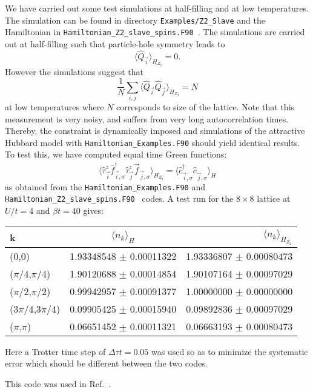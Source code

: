  We have carried out some test simulations at half-filling and at low temperatures.  The simulation can be found in directory \texttt{Examples/Z2\_Slave} and the  Hamiltonian in \texttt{Hamiltonian\_Z2\_slave\_spins.F90 }.  The simulations  are carried out at half-filling such that particle-hole symmetry leads to 
 \begin{equation}
 \langle \hat{Q}_{\vec{i}}    \rangle_{H_{Z_2}} =0.
 \end{equation} 
However the simulations suggest that 
 \begin{equation}
 \frac{1}{N}\sum_{i,j} \langle \hat{Q}_{\vec{i}}   \hat{Q}_{\vec{j}} \rangle_{H_{Z_2}}  = N 
 \end{equation} 
 at low temperatures  where  $N$  corresponds  to size of the lattice.  Note that this measurement is very noisy,  and suffers from very long autocorrelation times.  Thereby, the constraint is dynamically imposed and   simulations of the attractive Hubbard model with  \texttt{Hamiltonian\_Examples.F90}  should yield identical results. To test this,  we have computed equal time Green functions:
\begin{equation}
\langle  \hat{\tau}^{z}_{\vec{i}} \hat{f}^{\dagger}_{\vec{i},\sigma} \hat{\tau}^{z}_{\vec{j}} \vec{f}^{\phantom{\dagger}}_{\vec{j},\sigma} \rangle_{H_{Z_2}} = 
\langle  \hat{c}^{\dagger}_{\vec{i},\sigma} \hat{c}^{\phantom{\dagger}}_{\vec{j},\sigma} \rangle_{H} 
\end{equation}
as obtained  from  the \texttt{Hamiltonian\_Examples.F90} and    \texttt{Hamiltonian\_Z2\_slave\_spins.F90 } codes.  
A test run for the $8\times 8 $ lattice at $U/t = 4$ and $\beta t = 40$ gives: 
\begin{center}
\begin{tabular}{ l | c | r }
 \hline			
   k   &  $\langle n_k \rangle_{H} $  &  $\langle n_k \rangle_{H_{Z_2}} $ \\
  \hline
   (0,0)                               & 1.93348548    $\pm$    0.00011322  & 1.93336807   $\pm$      0.00080473 \\
   ($\pi/4$,$\pi/4$)             & 1.90120688     $\pm$   0.00014854  & 1.90107164    $\pm$     0.00097029  \\
   ($\pi/2$,$\pi/2$)             & 0.99942957     $\pm$   0.00091377  & 1.00000000    $\pm$     0.00000000\\
   ($3\pi/4$,$3\pi/4$)         &  0.09905425     $\pm$   0.00015940 & 0.09892836    $\pm$     0.00097029 \\
   ($\pi$,$\pi$)                   & 0.06651452     $\pm$   0.00011321  & 0.06663193     $\pm$    0.00080473 \\
  \hline  
\end{tabular}

\end{center} 
\vspace*{0.5cm}
Here a Trotter time step of  $\Delta \tau t = 0.05$ was used  so as to minimize the systematic error   which should be different  between the two codes. 

This code  was used in Ref.~\cite{Hohenadler19}. 

\newpage
